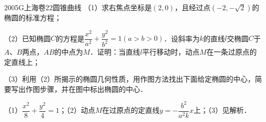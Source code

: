 
\begin{problem}{2005}{G}{上海卷}{22}{圆锥曲线}
（1）求右焦点坐标是$(2,0)$，且经过点$(-2,-\sqrt{2})$的椭圆的标准方程；

（2）已知椭圆$C$的方程是$\dfrac{x^{2}}{a^{2}}+\dfrac{y^{2}}{b^{2}}=1(a>b>0)$．设斜率为$k$的直线$l$交椭圆$C$于$A$、$B$两点，$AB$的中点为$M$．证明：当直线$l$平行移动时，动点$M$在一条过原点的定直线上；

（3）利用（2）所揭示的椭圆几何性质，用作图方法找出下面给定椭圆的中心，简要写出作图步骤，并在图中标出椭圆的中心．

\end{problem}

\begin{answer}
（1）$\dfrac{x^{2}}{8}+\dfrac{y^{2}}{4}=1$；（2）动点$M$在过原点的定直线$y=-\dfrac{b^{2}}{a^{2}k}x$上；（3）见解析．
\end{answer}

